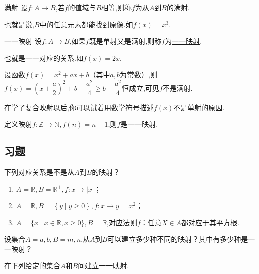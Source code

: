 \documentclass[lang=cn,math=cm,chinesefont=nofont,11pt,scheme=chinese,twocol]{elegantbook}
\begin{document}
\begin{definition}{满射}
  设$f:A\rightarrow B$,若$f$的值域与$B$相等,则称$f$为从$A$到$B$的\underline{满射}.
\end{definition}

也就是说,$B$中的任意元素都能找到原像.如$f(x)=x^3$.

\begin{definition}{一一映射}
  设$f:A\rightarrow B$,如果$f$既是单射又是满射,则称$f$为\underline{一一映射}.
\end{definition}

也就是一一对应的关系.如$f(x)=2x$.

\begin{example}
  设函数$f(x)=x^2+ax+b$（其中$a,b$为常数）,则$f(x)=(x+\dfrac{a}{2})^2+b-\dfrac{a^2}{4}\geqslant b-\dfrac{a^2}{4}$恒成立,可见$f$不是满射.

  在学了复合映射以后,你可以试着用数学符号描述$f(x)$不是单射的原因.
\end{example}

\begin{example}
  定义映射$f:\mathbb{Z}\rightarrow\mathbb{N},f(n)=n-1$,则$f$是一一映射.
\end{example}

\subsection{习题}

\begin{exercise}\label{HS2FZ_lkb1_P34_exp.4,BJSZ_Algebra1_P40}
  下列对应关系是不是从$A$到$B$的映射？
\end{exercise}

\begin{enumerate}
  \item $A=\mathbb{R},B=\mathbb{R}^{+},f:x\rightarrow\left|x\right|$；
  \item $A=\mathbb{R},B=\left\{y\mid y\geqslant 0\right\},f:x\rightarrow y=x^2$；
  \item $A=\{x\mid x\in\mathbb{R},x\geqslant0\},B=\mathbb{R}$,对应法则$f$：任意$X\in A$都对应于其平方根.
\end{enumerate}

\begin{exercise}
  设集合$A={a,b},B={m,n}$,从$A$到$B$可以建立多少种不同的映射？其中有多少种是一一映射？
\end{exercise}

\begin{exercise}
  在下列给定的集合$A$和$B$间建立一一映射.
\end{exercise}
\end{document}
